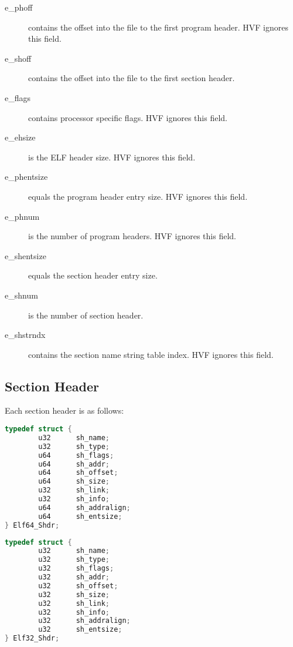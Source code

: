 \begin{description}
\item[e\_phoff] contains the offset into the file to the first program
	header.  HVF ignores this field.

\item[e\_shoff] contains the offset into the file to the first section
	header.

\item[e\_flags] contains processor specific flags.  HVF ignores this field.

\item[e\_ehsize] is the ELF header size.  HVF ignores this field.

\item[e\_phentsize] equals the program header entry size.  HVF ignores this
	field.

\item[e\_phnum] is the number of program headers.  HVF ignores this field.

\item[e\_shentsize] equals the section header entry size.

\item[e\_shnum] is the number of section header.

\item[e\_shstrndx] contains the section name string table index.  HVF
	ignores this field.
\end{description}

\cbstart
\subsection{Section Header}
Each section header is as follows:

\begin{lstlisting}[language=C]
typedef struct {
        u32      sh_name;
        u32      sh_type;
        u64      sh_flags;
        u64      sh_addr;
        u64      sh_offset;
        u64      sh_size;
        u32      sh_link;
        u32      sh_info;
        u64      sh_addralign;
        u64      sh_entsize;
} Elf64_Shdr;
\end{lstlisting}

\cbstart
\begin{lstlisting}[language=C]
typedef struct {
        u32      sh_name;
        u32      sh_type;
        u32      sh_flags;
        u32      sh_addr;
        u32      sh_offset;
        u32      sh_size;
        u32      sh_link;
        u32      sh_info;
        u32      sh_addralign;
        u32      sh_entsize;
} Elf32_Shdr;
\end{lstlisting}
\cbend

